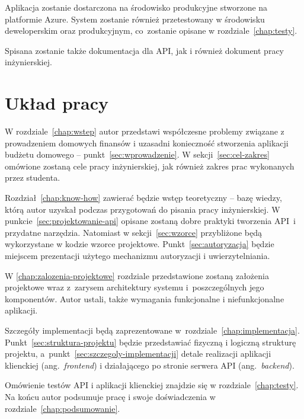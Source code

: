 Aplikacja zostanie dostarczona na środowisko produkcyjne stworzone na platformie Azure. System zostanie również przetestowany w środowisku deweloperskim oraz produkcyjnym, co~zostanie opisane w rozdziale~\ref{chap:testy}.

Spisana zostanie także dokumentacja dla API, jak i również dokument pracy inżynierskiej.

\section{Układ pracy}
\label{sec:uklad-pracy}
W rozdziale~\ref{chap:wstep} autor przedstawi współczesne problemy związane z prowadzeniem domowych finansów i uzasadni konieczność stworzenia aplikacji budżetu domowego -- punkt~\ref{sec:wprowadzenie}. W sekcji~\ref{sec:cel-zakres} omówione zostaną cele pracy inżynierskiej, jak również zakres prac wykonanych  przez studenta.

Rozdział~\ref{chap:know-how} zawierać będzie wstęp teoretyczny -- bazę wiedzy, którą autor uzyskał podczas przygotowań do pisania pracy inżynierskiej. W punkcie~\ref{sec:projektowanie-api} opisane zostaną dobre praktyki tworzenia API~i przydatne narzędzia. Natomiast w sekcji~\ref{sec:wzorce} przybliżone będą wykorzystane w kodzie wzorce projektowe. Punkt~\ref{sec:autoryzacja} będzie miejscem prezentacji użytego mechanizmu autoryzacji i uwierzytelniania.

W \ref{chap:zalozenia-projektowe} rozdziale przedstawione zostaną założenia projektowe wraz z~zarysem architektury systemu i~poszczególnych jego komponentów. Autor ustali, także wymagania funkcjonalne i niefunkcjonalne aplikacji.

Szczegóły implementacji będą zaprezentowane w~rozdziale~\ref{chap:implementacja}. Punkt~\ref{sec:struktura-projektu} będzie przedstawiać fizyczną i logiczną strukturę projektu, a~punkt~\ref{sec:szczegoly-implementacji} detale realizacji aplikacji klienckiej (ang.~\emph{frontend}) i działającego po stronie serwera API (ang.~\emph{backend}).

Omówienie testów API i aplikacji klienckiej znajdzie się w rozdziale~\ref{chap:testy}. Na końcu autor podsumuje pracę i swoje doświadczenia w rozdziale~\ref{chap:podsumowanie}.